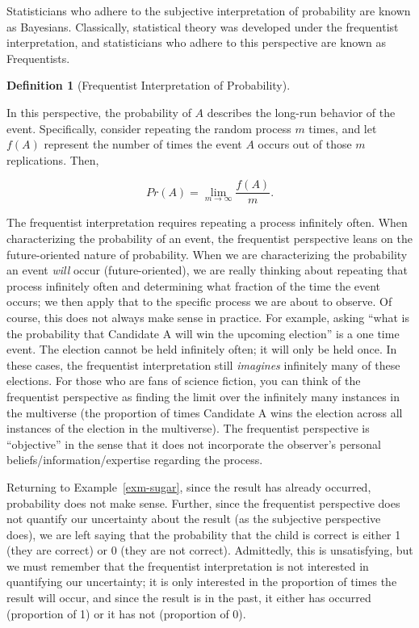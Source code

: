\documentclass[
  letterpaper,
  DIV=11,
  numbers=noendperiod]{scrreprt}
\theoremstyle{definition}
\theoremstyle{definition}
\newtheorem{definition}{Definition}[chapter]
\theoremstyle{plain}
\theoremstyle{remark}
\begin{document}
Statisticians who adhere to the subjective interpretation of probability
are known as Bayesians. Classically, statistical theory was developed
under the frequentist interpretation, and statisticians who adhere to
this perspective are known as Frequentists.

\begin{definition}[Frequentist Interpretation of
Probability]\protect\hypertarget{def-frequentist-interpretation}{}\label{def-frequentist-interpretation}

In this perspective, the probability of \(A\) describes the long-run
behavior of the event. Specifically, consider repeating the random
process \(m\) times, and let \(f(A)\) represent the number of times the
event \(A\) occurs out of those \(m\) replications. Then,

\[Pr(A) = \lim_{m \rightarrow \infty} \frac{f(A)}{m}.\]

\end{definition}

The frequentist interpretation requires repeating a process infinitely
often. When characterizing the probability of an event, the frequentist
perspective leans on the future-oriented nature of probability. When we
are characterizing the probability an event \emph{will} occur
(future-oriented), we are really thinking about repeating that process
infinitely often and determining what fraction of the time the event
occurs; we then apply that to the specific process we are about to
observe. Of course, this does not always make sense in practice. For
example, asking ``what is the probability that Candidate A will win the
upcoming election'' is a one time event. The election cannot be held
infinitely often; it will only be held once. In these cases, the
frequentist interpretation still \emph{imagines} infinitely many of
these elections. For those who are fans of science fiction, you can
think of the frequentist perspective as finding the limit over the
infinitely many instances in the multiverse (the proportion of times
Candidate A wins the election across all instances of the election in
the multiverse). The frequentist perspective is ``objective'' in the
sense that it does not incorporate the observer's personal
beliefs/information/expertise regarding the process.

Returning to Example~\ref{exm-sugar}, since the result has already
occurred, probability does not make sense. Further, since the
frequentist perspective does not quantify our uncertainty about the
result (as the subjective perspective does), we are left saying that the
probability that the child is correct is either 1 (they are correct) or
0 (they are not correct). Admittedly, this is unsatisfying, but we must
remember that the frequentist interpretation is not interested in
quantifying our uncertainty; it is only interested in the proportion of
times the result will occur, and since the result is in the past, it
either has occurred (proportion of 1) or it has not (proportion of 0).
\end{document}
